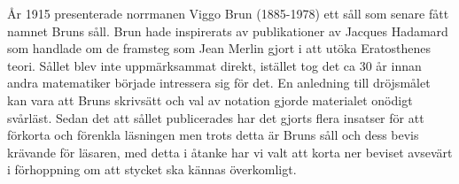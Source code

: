 
År 1915 presenterade norrmanen Viggo Brun (1885-1978) ett såll som senare fått namnet Bruns såll. Brun hade inspirerats av publikationer av Jacques Hadamard som handlade om de framsteg som Jean Merlin gjort i att utöka Eratosthenes teori. Sållet blev inte uppmärksammat direkt, istället tog det ca 30 år innan andra matematiker började intressera sig för det. En anledning till dröjsmålet kan vara att Bruns skrivsätt och val av notation gjorde materialet onödigt svårläst. Sedan det att sållet publicerades har det gjorts flera insatser för att förkorta och förenkla läsningen men trots detta är Bruns såll och dess bevis krävande för läsaren, med detta i åtanke har vi valt att korta ner beviset avsevärt i förhoppning om att stycket ska kännas överkomligt.



